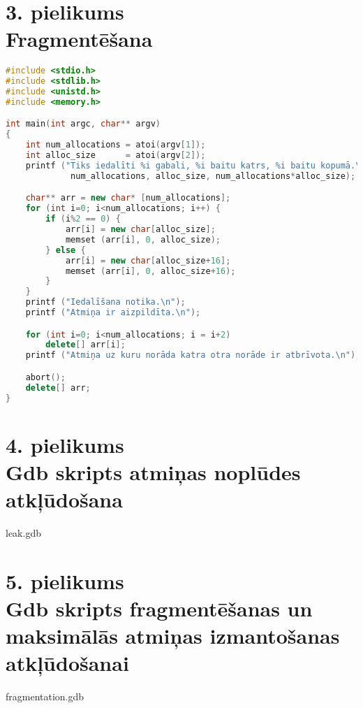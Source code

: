 \newpage
\chapter[3. pielikums. Fragmentēšana] {3. pielikums \\  Fragmentēšana}


\begin{lstlisting}[language=C++]
#include <stdio.h>
#include <stdlib.h>
#include <unistd.h>
#include <memory.h>

int main(int argc, char** argv)
{
	int num_allocations = atoi(argv[1]);
	int alloc_size      = atoi(argv[2]);
	printf ("Tiks iedalīti %i gabali, %i baitu katrs, %i baitu kopumā.\n",
	         num_allocations, alloc_size, num_allocations*alloc_size);

	char** arr = new char* [num_allocations];
	for (int i=0; i<num_allocations; i++) {
		if (i%2 == 0) {
			arr[i] = new char[alloc_size];
			memset (arr[i], 0, alloc_size);
		} else {
			arr[i] = new char[alloc_size+16];
			memset (arr[i], 0, alloc_size+16);
		}
	}
	printf ("Iedalīšana notika.\n");
	printf ("Atmiņa ir aizpildīta.\n");

	for (int i=0; i<num_allocations; i = i+2)
		delete[] arr[i];
	printf ("Atmiņa uz kuru norāda katra otra norāde ir atbrīvota.\n");

	abort();
	delete[] arr;
} 
\end{lstlisting}

\newpage
\chapter[4. pielikums. Gdb skripts atmiņas noplūdes atkļūdošanai] {4. pielikums \\  Gdb skripts atmiņas noplūdes atkļūdošana}
{leak.gdb}

\newpage
\chapter[5. pielikums. Gdb skripts fragmentēšanas un maksimālās atmiņas izmantošanas atkļūdošanai] {5. pielikums \\ Gdb skripts fragmentēšanas un maksimālās atmiņas izmantošanas atkļūdošanai}
{fragmentation.gdb}
